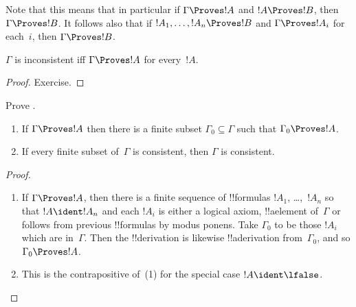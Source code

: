 Note that this means that in particular if $\Gamma \Proves !A$ and $!A
\Proves !B$, then $\Gamma \Proves !B$. It follows also that if $!A_1,
\dots, !A_n \Proves !B$ and $\Gamma \Proves !A_i$ for each~$i$, then
$\Gamma \Proves !B$.

\begin{prop}
$\Gamma$ is inconsistent iff $\Gamma \Proves !A$ for every~$!A$.
\end{prop}

\begin{proof}
Exercise.
\end{proof}


\begin{prob}
Prove .
\end{prob}




\begin{prop}[Compactness]
  \begin{enumerate}
  \item If $\Gamma \Proves !A$ then there is a finite subset $\Gamma_0
    \subseteq \Gamma$ such that $\Gamma_0 \Proves !A$.
  \item If every finite subset of~$\Gamma$ is
    consistent, then $\Gamma$ is consistent.
  \end{enumerate}
\end{prop}

\begin{proof}
  \begin{enumerate}
    \item If $\Gamma \Proves !A$, then there is a finite sequence of
      !!{formula}s $!A_1$, \dots,~$!A_n$ so that $!A \ident !A_n$ and
      each $!A_i$ is either a logical axiom, !!a{element} of~$\Gamma$
      or follows from previous !!{formula}s by modus ponens.  Take
      $\Gamma_0$ to be those $!A_i$ which are in~$\Gamma$.  Then the
      !!{derivation} is likewise !!a{derivation} from~$\Gamma_0$, and
      so $\Gamma_0 \Proves !A$.
    \item This is the contrapositive of~(1) for the special case $!A
      \ident \lfalse$.
\end{enumerate}
\end{proof}








